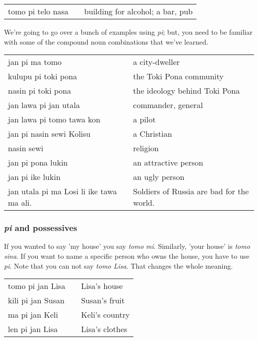 \begin{supertabular}{p{5,5cm}|ll}
tomo pi telo nasa && building for alcohol; a bar, pub \\
\end{supertabular}  

We're going to go over a bunch of examples using \textit{pi}; but, you need to be familiar with some of the compound noun combinations that we've learned. 

\begin{supertabular}{p{5,5cm}|ll}
jan pi ma tomo && a city-dweller \\
kulupu pi toki pona && the Toki Pona community \\
nasin pi toki pona && the ideology behind Toki Pona \\
jan lawa pi jan utala && commander, general \\
jan lawa pi tomo tawa kon && a pilot \\
jan pi nasin sewi Kolisu && a Christian \\
nasin sewi && religion \\
jan pi pona lukin && an attractive person \\
jan pi ike lukin && an ugly person \\
jan utala pi ma Losi li ike tawa ma ali. && Soldiers of Russia are bad for the world. \\
\end{supertabular}  
%
\subsubsection*{\textit{pi} and possessives} 
%
If you wanted to say 'my house' you say \textit{tomo mi}. 
Similarly, 'your house' is \textit{tomo sina}. 
If you want to name a specific person who owns the house, you have to use \textit{pi}. 
Note that you can not say \textit{tomo Lisa}. 
That changes the whole meaning. 

\begin{supertabular}{p{5,5cm}|ll}
tomo pi jan Lisa && Lisa's house \\
kili pi jan Susan && Susan's fruit \\
ma pi jan Keli && Keli's country \\
len pi jan Lisa && Lisa's clothes \\
\end{supertabular}  

